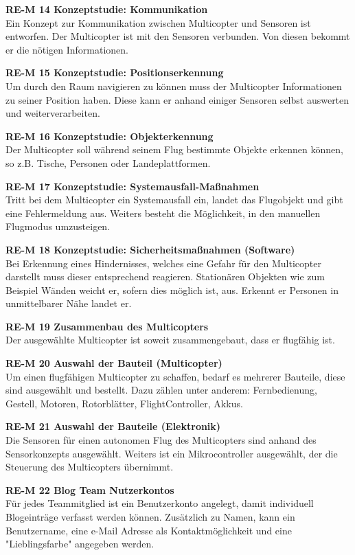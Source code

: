   \textbf{RE-M 14 Konzeptstudie: Kommunikation}\\
  Ein Konzept zur Kommunikation zwischen Multicopter und Sensoren ist entworfen.
  Der Multicopter ist mit den Sensoren verbunden. Von diesen bekommt er die nötigen Informationen.

  \textbf{RE-M 15 Konzeptstudie: Positionserkennung}\\
  Um durch den Raum navigieren zu können muss der Multicopter Informationen zu seiner Position haben.
  Diese kann er anhand einiger Sensoren selbst auswerten und weiterverarbeiten.

  \textbf{RE-M 16 Konzeptstudie: Objekterkennung}\\
  Der Multicopter soll während seinem Flug bestimmte Objekte erkennen können, so z.B. Tische,
  Personen oder Landeplattformen.

  \textbf{RE-M 17 Konzeptstudie: Systemausfall-Maßnahmen}\\
  Tritt bei dem Multicopter ein Systemausfall ein, landet das Flugobjekt und gibt eine Fehlermeldung aus.
  Weiters besteht die Möglichkeit, in den manuellen Flugmodus umzusteigen.

  \textbf{RE-M 18 Konzeptstudie: Sicherheitsmaßnahmen (Software)}\\
  Bei Erkennung eines Hindernisses, welches eine Gefahr für den Multicopter darstellt muss dieser
  entsprechend reagieren. Stationären Objekten wie zum Beispiel Wänden weicht er, sofern dies
  möglich ist, aus. Erkennt er Personen in unmittelbarer Nähe landet er.

  \textbf{RE-M 19 Zusammenbau des Multicopters}\\
  Der ausgewählte Multicopter ist soweit zusammengebaut, dass er flugfähig ist.

  \textbf{RE-M 20 Auswahl der Bauteil (Multicopter)}\\
  Um einen flugfähigen Multicopter zu schaffen, bedarf es mehrerer Bauteile, diese sind ausgewählt
  und bestellt. Dazu zählen unter anderem: Fernbedienung, Gestell, Motoren, Rotorblätter,
  FlightController, Akkus.

  \textbf{RE-M 21 Auswahl der Bauteile (Elektronik)}\\
  Die Sensoren für einen autonomen Flug des Multicopters sind anhand des Sensorkonzepts
  ausgewählt. Weiters ist ein Mikrocontroller ausgewählt, der die Steuerung des Multicopters
  übernimmt.

  \textbf{RE-M 22 Blog Team Nutzerkontos}\\
  Für jedes Teammitglied ist ein Benutzerkonto angelegt, damit individuell Blogeinträge
  verfasst werden können. Zusätzlich zu Namen, kann ein Benutzername, eine e-Mail Adresse
  als Kontaktmöglichkeit und eine "Lieblingsfarbe" angegeben werden.

